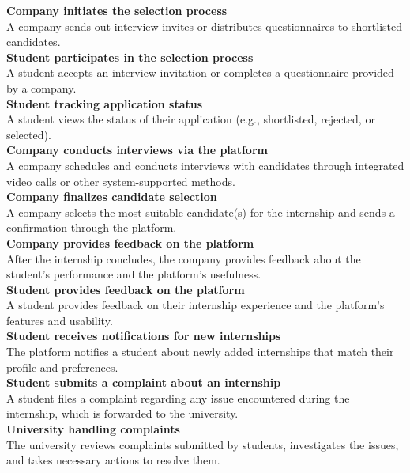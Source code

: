 \textbf{Company initiates the selection process}\\
A company sends out interview invites or distributes questionnaires to shortlisted candidates.\\

\textbf{Student participates in the selection process}\\
A student accepts an interview invitation or completes a questionnaire provided by a company.\\

\textbf{Student tracking application status}\\
A student views the status of their application (e.g., shortlisted, rejected, or selected).\\

\textbf{Company conducts interviews via the platform}\\
A company schedules and conducts interviews with candidates through integrated video calls or other system-supported methods.\\

\textbf{Company finalizes candidate selection}\\
A company selects the most suitable candidate(s) for the internship and sends a confirmation through the platform.\\

\textbf{Company provides feedback on the platform}\\
After the internship concludes, the company provides feedback about the student’s performance and the platform’s usefulness.\\

\textbf{Student provides feedback on the platform}\\
A student provides feedback on their internship experience and the platform’s features and usability.\\

\textbf{Student receives notifications for new internships}\\
The platform notifies a student about newly added internships that match their profile and preferences.\\

\textbf{Student submits a complaint about an internship}\\
A student files a complaint regarding any issue encountered during the internship, which is forwarded to the university.\\

\textbf{University handling complaints}\\
The university reviews complaints submitted by students, investigates the issues, and takes necessary actions to resolve them.\\

